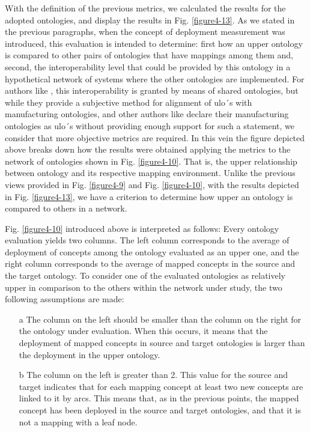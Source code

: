 With the definition of the previous metrics, we calculated the results for the adopted ontologies, and  display the results in Fig. \ref{figure4-13}. As we stated in the previous paragraphs, when the concept of deployment measurement  was introduced, this evaluation is intended to determine: first how an upper ontology is compared to other pairs of ontologies that have mappings among them and, second, the interoperability level  that could be provided by this ontology in a hypothetical network of systems where the other ontologies are implemented. For authors like \cite{borgo_role_2004}, this interoperability is granted by means of shared ontologies, but while they provide a subjective method for alignment of \gls{ulo}´s with manufacturing ontologies, and other authors like \cite{lemaignan_mason:_2006} declare their manufacturing ontologies as \gls{ulo}´s without providing enough support for such a statement, we consider that more objective metrics are required. In this vein the figure depicted above breaks down how the results were obtained applying the metrics to the network of ontologies shown in Fig. \ref{figure4-10}. That is, the upper relationship between ontology and its respective mapping environment. Unlike the previous  views provided in Fig. \ref{figure4-9} and Fig. \ref{figure4-10}, with the results depicted in Fig. \ref{figure4-13}, we have a criterion to determine how upper an ontology is compared to others in a network. 


Fig. \ref{figure4-10} introduced above is interpreted as follows: Every ontology evaluation yields two columns. The left column corresponds to the average of  deployment of concepts among the ontology evaluated as an upper one, and the right column corresponds to the  average of mapped   concepts in the source and the target ontology. To consider one of the evaluated ontologies as relatively upper in comparison to the others within the network under study, the two following assumptions are made:

\begin{itemize}
	\item [a] The column on the left should be smaller than the column on the right for the ontology under evaluation. When this occurs, it means that the deployment of mapped concepts in source and target ontologies is larger than the deployment in the upper ontology.
	
	\item [b] The column on the left is greater than 2. This value for the source and target indicates that for each mapping concept at least two new concepts are linked to it by arcs. This means that, as in the previous points, the mapped concept has been deployed in the source and target ontologies, and that it is not a mapping with a leaf node.
	
\end{itemize}

